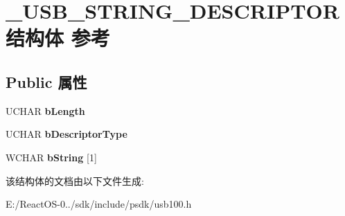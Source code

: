 \hypertarget{struct___u_s_b___s_t_r_i_n_g___d_e_s_c_r_i_p_t_o_r}{}\section{\+\_\+\+U\+S\+B\+\_\+\+S\+T\+R\+I\+N\+G\+\_\+\+D\+E\+S\+C\+R\+I\+P\+T\+O\+R结构体 参考}
\label{struct___u_s_b___s_t_r_i_n_g___d_e_s_c_r_i_p_t_o_r}
\subsection*{Public 属性}
\begin{DoxyCompactItemize}
\item 
\mbox{\label{struct___u_s_b___s_t_r_i_n_g___d_e_s_c_r_i_p_t_o_r_aec269a4cf8f00b8e0e199995175dd185}} 
U\+C\+H\+AR {\bfseries b\+Length}
\item 
\mbox{\label{struct___u_s_b___s_t_r_i_n_g___d_e_s_c_r_i_p_t_o_r_a75c8699e4d4937406d0fe580e855847b}} 
U\+C\+H\+AR {\bfseries b\+Descriptor\+Type}
\item 
\mbox{\label{struct___u_s_b___s_t_r_i_n_g___d_e_s_c_r_i_p_t_o_r_a2bc7ec601e0de06a53aab0ebe3bede9a}} 
W\+C\+H\+AR {\bfseries b\+String} \mbox{[}1\mbox{]}
\end{DoxyCompactItemize}


该结构体的文档由以下文件生成\+:\begin{DoxyCompactItemize}
\item 
E\+:/\+React\+O\+S-\/0../sdk/include/psdk/usb100.\+h\end{DoxyCompactItemize}
